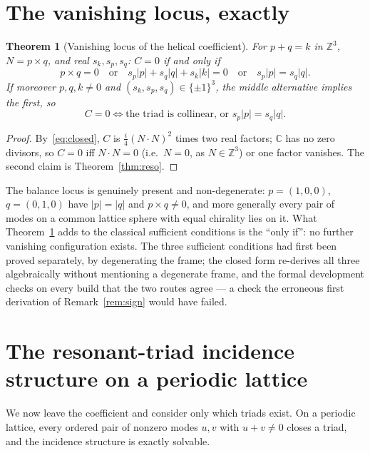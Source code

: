 \documentclass[11pt]{amsart}
\newcommand{\C}{\mathbb{C}}
\newcommand{\Z}{\mathbb{Z}}
\theoremstyle{plain}
\newtheorem{theorem}{Theorem}[section]
\theoremstyle{definition}
\theoremstyle{remark}
\begin{document}
\section{The vanishing locus, exactly}
\label{sec:closed}

\begin{theorem}[Vanishing locus of the helical coefficient]
\label{thm:converse}
For $p + q = k$ in $\Z^3$, $N = p \times q$, and real $s_k, s_p, s_q$: $C = 0$ if and only if
\[
  p \times q = 0 \quad\text{or}\quad s_p|p| + s_q|q| + s_k|k| = 0 \quad\text{or}\quad s_p|p| = s_q|q|.
\]
If moreover $p, q, k \ne 0$ and $(s_k, s_p, s_q) \in \{\pm1\}^3$, the middle alternative implies the
first, so
\[
  C = 0 \iff \text{the triad is collinear, or } s_p|p| = s_q|q| .
\]
\end{theorem}

\begin{proof}
By~\eqref{eq:closed}, $C$ is $\frac{i}{4}(N\cdot N)^2$ times two real factors; $\C$ has no zero
divisors, so $C = 0$ iff $N \cdot N = 0$ (i.e.\ $N = 0$, as $N \in \Z^3$) or one factor vanishes.
The second claim is Theorem~\ref{thm:reso}.
\end{proof}

The balance locus is genuinely present and non-degenerate: $p = (1,0,0)$, $q = (0,1,0)$ have
$|p| = |q|$ and $p \times q \ne 0$, and more generally every pair of modes on a common lattice
sphere with equal chirality lies on it. What Theorem~\ref{thm:converse} adds to the classical
sufficient conditions is the ``only if'': no further vanishing configuration exists. The three
sufficient conditions had first been proved separately, by degenerating the frame; the closed form
re-derives all three algebraically without mentioning a degenerate frame, and the formal
development checks on every build that the two routes agree --- a check the erroneous first
derivation of Remark~\ref{rem:sign} would have failed.

\section{The resonant-triad incidence structure on a periodic lattice}
\label{sec:torus}

We now leave the coefficient and consider only which triads exist. On a periodic lattice, every
ordered pair of nonzero modes $u, v$ with $u + v \ne 0$ closes a triad, and the incidence
structure is exactly solvable.
\end{document}
